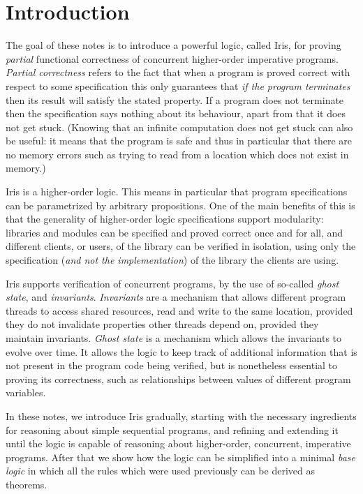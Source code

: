 \section{Introduction}
\label{sec:introduction}

The goal of these notes is to introduce a powerful logic, called Iris, for proving \emph{partial} functional correctness of concurrent higher-order imperative programs.
\emph{Partial correctness} refers to the fact that when a program is proved correct with respect to some specification this only guarantees that \emph{if the program terminates} then its result will satisfy the stated property.
If a program does not terminate then the specification says nothing about its behaviour, apart from that it does not get stuck. (Knowing that an infinite computation does not get stuck can also be useful: it means that the program is safe and thus in particular that
there are no memory errors such as trying to read from a location which does not exist in memory.)

Iris is a higher-order logic.
This means in particular that program specifications can be parametrized by arbitrary propositions.
One of the main benefits of this is that the generality of higher-order logic specifications support modularity: libraries and modules can be specified and proved correct once and for all, and different clients, or users, of the library can be verified in isolation, using only the specification (\emph{and not the implementation}) of the library the clients are using.

Iris supports verification of concurrent programs, by the use of 
so-called \emph{ghost state}, and \emph{invariants}.
\emph{Invariants} are a mechanism that allows different program threads to access shared resources, \eg{} read and write to the same location, provided they do not invalidate properties other threads depend on, \ie{} provided they maintain invariants.
\emph{Ghost state} is a mechanism which allows the invariants to evolve over time.
It allows the logic to keep track of additional information that is not present in the program code being verified, but is nonetheless essential to proving its correctness, such as relationships between values of different program variables.

In these notes, we introduce Iris gradually, starting with the necessary ingredients for reasoning about simple sequential programs, and refining and extending it until the logic is capable of reasoning about higher-order, concurrent, imperative programs.
After that we show how the logic can be simplified into a minimal \emph{base logic} in which all the rules which were used previously can be derived as theorems.

